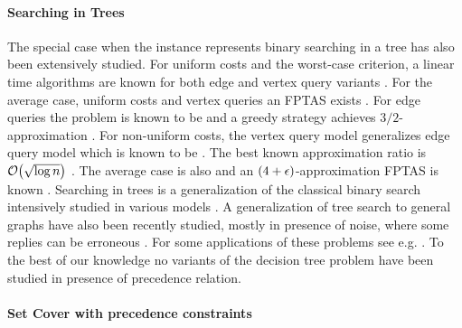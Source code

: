 \paragraph{Searching in Trees}
The special case when the instance represents binary searching in a tree has also been extensively studied.
For uniform costs and the worst-case criterion, a linear time algorithms are known for both edge and vertex query variants \cite{Schaffer1989OptNodeRankOfTsInLinTime,OnakParys2006GenOfBSSInTsAndFLikePosets,Mozes_Onak2008FindOptTSStartInLinTime}. For the average case, uniform costs and vertex queries an FPTAS exists \cite{SearchTreesOnGraphs}. For edge queries the problem is known to be \NPhard \cite{OnTheComplexityOfSearchingInTreesAverageCaseMinimization} and a greedy strategy achieves $3/2$-approximation \cite{OnTheComplexityOfSearchingInTreesAverageCaseMinimization,ImprovedApproximationAlgorithmsForTheAverageCaseTreeSearchingProblem,TightApproximationBoundsOnASimpleAlgorithmForMinimumAverageSearchTimeInTrees}. For non-uniform costs, the vertex query model generalizes edge query model which is known to be \NPhard \cite{EdgeRankingOfWeightedTrees,TheBinaryIdentificationProblemForWeightedTrees,OnTheTreeSearchProblemWithNonUniformCosts}. The best known approximation ratio is $\mathcal{O}\mathopen{}\left( \sqrt{\log n} \right)$ \cite{ApproximationStrategiesforGeneralizedBinarySearchinWeightedTrees}.
The average case is also \NPhard and an $\mathopen{}\left( 4+\epsilon \right)$-approximation FPTAS is known \cite{szyfelbein2025approximatingaveragecasegraphsearch}.
Searching in trees is a generalization of the classical binary search intensively studied in various models \cite{BorgstromK93,LaberMP02,BayesianLearnerOptimalNoisyBinarySearch,DereniowskiLU25}.
A generalization of tree search to general graphs have also been recently studied, mostly in presence of noise, where some replies can be erroneous \cite{Emamjomeh-Zadeh16,DereniowskiLU25}.
For some applications of these problems see e.g. \cite{Emamjomeh-Zadeh17,KarpK07}.
To the best of our knowledge no variants of the decision tree problem have been studied in presence of precedence relation.

\paragraph{Set Cover with precedence constraints}

